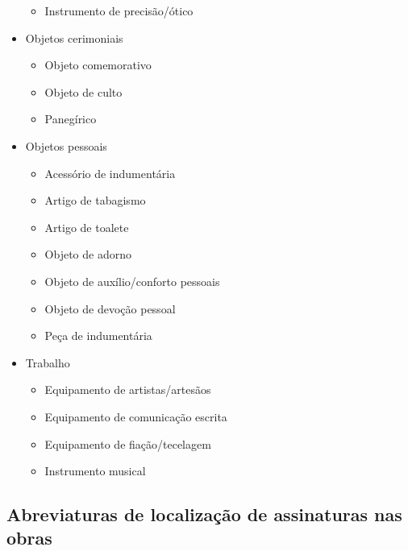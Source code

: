 \begin{itemize}
	\begin{itemize}
		\item Instrumento de precisão/ótico
	\end{itemize}
	\item Objetos cerimoniais
	\begin{itemize}
		\item Objeto comemorativo
		\item Objeto de culto
		\item Panegírico
	\end{itemize}
	\item Objetos pessoais
	\begin{itemize}
		\item Acessório de indumentária
		\item Artigo de tabagismo
		\item Artigo de toalete
		\item Objeto de adorno
		\item Objeto de auxílio/conforto pessoais
		\item Objeto de devoção pessoal
		\item Peça de indumentária
	\end{itemize}
	\item Trabalho
	\begin{itemize}
		\item Equipamento de artistas/artesãos
		\item Equipamento de comunicação escrita
		\item Equipamento de fiação/tecelagem
		\item Instrumento musical
	\end{itemize}
\end{itemize}

\subsection{Abreviaturas de localização de assinaturas nas obras}
 
